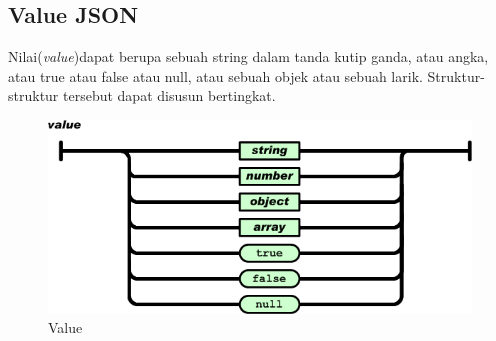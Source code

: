 \subsection{Value JSON}
\label{subsec:valuejson}

Nilai(\textit{value})dapat berupa sebuah string dalam tanda kutip ganda, atau angka, atau true atau false atau null, atau sebuah objek atau sebuah larik. Struktur-struktur tersebut dapat disusun bertingkat.
\begin{figure}[H]
	\centering		
	\includegraphics[scale=0.4]{Gambar/value.png}
	\caption[Value]{Value}
	\label{fig:value}	
\end{figure}

